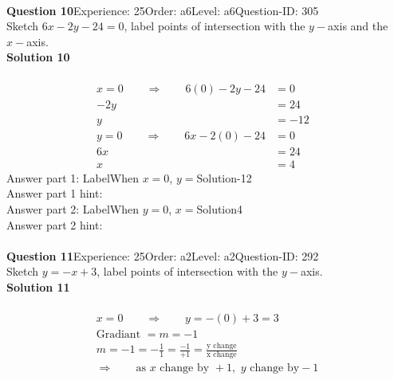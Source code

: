 \documentclass{article}
\begin{document}
\\[4pt]
\noindent\textbf{Question 10}\hspace{20pt}Experience: 25\hspace{20pt}Order: a6\hspace{20pt}Level: a6\hspace{20pt}Question-ID: 305\\[2pt]
Sketch $6x-2y-24=0$, label points of intersection with the $y-$axis and the $x-$axis.\\[4pt]
\noindent\textbf{Solution 10}\\[2pt]
\\[-35pt]\begin{align*}
x=0\qquad\Rightarrow\qquad 6(0)-2y-24&=0&\\[2pt]
-2y&=24\\[2pt]
y&=-12\\[12pt]
y=0\qquad\Rightarrow\qquad 6x-2(0)-24&=0&\\[2pt]
6x&=24\\[2pt]
x&=4
\end{align*}
Answer part 1: \hspace{10pt}Label\hspace{10pt}When $x=0$, $y=$\hspace{10pt}Solution\hspace{10pt}-12\\
Answer part 1 hint: \hspace{15pt}\\
Answer part 2: \hspace{10pt}Label\hspace{10pt}When $y=0$, $x=$\hspace{10pt}Solution\hspace{10pt}4\\
Answer part 2 hint: \hspace{15pt}\\
\\[4pt]
\noindent\textbf{Question 11}\hspace{20pt}Experience: 25\hspace{20pt}Order: a2\hspace{20pt}Level: a2\hspace{20pt}Question-ID: 292\\[2pt]
Sketch $y=-x+3$, label points of intersection with the $y-$axis.\\[4pt]
\noindent\textbf{Solution 11}\\[2pt]
\\[-35pt]\begin{align*}
&x=0\qquad\Rightarrow\qquad y=-(0)+3=3&\\[2pt]
&\text{Gradiant}\,\,=m=-1&\\[2pt]
&m=-1=-\displaystyle\frac{1}{1}=\displaystyle\frac{-1}{+1}=\displaystyle\frac{\text{y change}}{\text{x change}}&\\[2pt]
& \Rightarrow\qquad \text{as}\,\, x \,\,\text{change by } +1,\,\, y\,\, \text{change by} -1 &
\end{align*}
\end{document}

